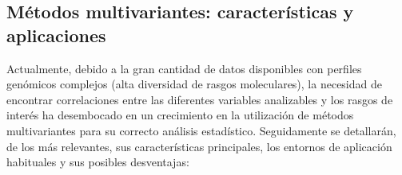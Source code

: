 \documentclass[IB,BIB]{TFUOC}%
\begin{document}
\subsection{Métodos multivariantes: características y aplicaciones}
\label{sec:Métodos multivariantes: características y aplicaciones}

Actualmente, debido a la gran cantidad de datos disponibles con perfiles genómicos complejos (alta diversidad de rasgos moleculares), la necesidad de encontrar correlaciones entre las diferentes variables analizables y los rasgos de interés ha desembocado en un crecimiento en la utilización de métodos multivariantes para su correcto análisis estadístico. Seguidamente se detallarán, de los más relevantes, sus características principales, los entornos de aplicación habituales y sus posibles desventajas:
\end{document}
